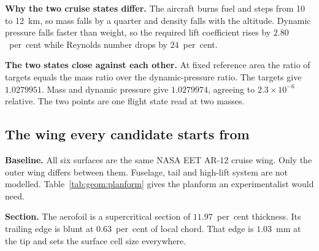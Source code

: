 \textbf{Why the two cruise states differ.} The aircraft burns fuel and steps from 10 to 12~km, so
mass falls by a quarter and density falls with the altitude. Dynamic pressure falls faster than
weight, so the required lift coefficient rises by $2.80$~per~cent while Reynolds number drops by
$24$~per~cent.

\textbf{The two states close against each other.} At fixed reference area the ratio of targets
equals the mass ratio over the dynamic-pressure ratio. The targets give $1.0279951$. Mass and
dynamic pressure give $1.0279974$, agreeing to $2.3\times10^{-6}$ relative. The two points are one
flight state read at two masses.

\subsection{The wing every candidate starts from}
\label{sec:geom:baseline}

\textbf{Baseline.} All six surfaces are the same NASA EET AR-12 cruise wing. Only the outer wing
differs between them. Fuselage, tail and high-lift system are not modelled.
Table~\ref{tab:geom:planform} gives the planform an experimentalist would need.

\textbf{Section.} The aerofoil is a supercritical section of $11.97$~per~cent thickness. Its
trailing edge is blunt at $0.63$~per~cent of local chord. That edge is $1.03$~mm at the tip and
sets the surface cell size everywhere.

